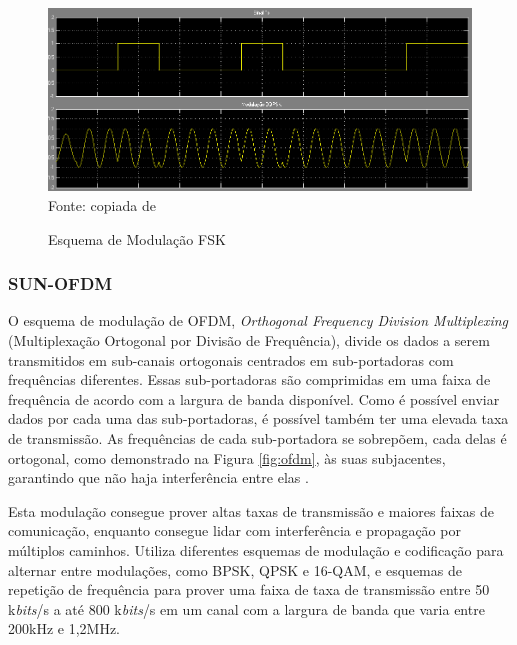 \begin{figure}[ht]
	\begin{center}
		\caption{Esquema de Modulação FSK}
		\includegraphics[width=.7\textwidth]{./sections/textual/chapters/images/oqpsk.png}\\
		Fonte: copiada de \cite{figOQPSK}
		\label{fig:oqpsk}
	\end{center}
\end{figure}


\subsubsection{SUN-OFDM}
O esquema de modulação de OFDM, \emph{Orthogonal Frequency Division Multiplexing} (Multiplexação Ortogonal por Divisão de Frequência), divide os dados a serem transmitidos em sub-canais ortogonais centrados em  sub-portadoras com frequências diferentes. Essas sub-portadoras são comprimidas em uma faixa de frequência de acordo com a largura de banda disponível. Como é possível enviar dados por cada uma das sub-portadoras, é possível também ter uma elevada taxa de transmissão. As frequências de cada sub-portadora se sobrepõem, cada delas é ortogonal, como demonstrado na Figura \ref{fig:ofdm}, às suas subjacentes, garantindo que não haja interferência entre elas \cite{rappaport2009}\cite{goldsmith2005wireless}.

Esta modulação consegue prover altas taxas de transmissão e maiores faixas de comunicação, enquanto consegue lidar com interferência e propagação por múltiplos caminhos. Utiliza diferentes esquemas de modulação e codificação para alternar entre modulações, como BPSK, QPSK e 16-QAM, e esquemas de repetição de frequência para prover uma faixa de taxa de transmissão entre 50 k\emph{bits}/s a até 800 k\emph{bits}/s em um canal com a largura de banda que varia entre 200kHz e 1,2MHz.

